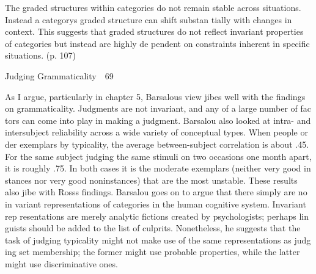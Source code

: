 \begin{styleStandard}
The graded structures within categories do not remain stable across situations. Instead a category{\textquotesingle}s graded structure can shift substan\- tially with changes in context. This suggests that graded structures do not reflect invariant properties of categories but instead are highly de\- pendent on constraints inherent in specific situations. (p. 107)
\end{styleStandard}


\clearpage\setcounter{page}{1}\begin{styleStandard}
Judging Grammaticality\ \ 69
\end{styleStandard}


\begin{styleTextbody}
As I argue, particularly in chapter 5, Barsalou{\textquotesingle}s view jibes well with the findings on grammaticality. Judgments are not invariant, and any of a large number of fac\- tors can come into play in making a judgment. Barsalou also looked at intra- and intersubject reliability across a wide variety of conceptual types. When people or\- der exemplars by typicality, the average between-subject correlation is about .45. For the same subject judging the same stimuli on two occasions one month apart, it is roughly .75. In both cases it is the moderate exemplars (neither very good in\- stances nor very good noninstances) that are the most unstable. These results also jibe with Ross{\textquotesingle}s findings. Barsalou goes on to argue that there simply are no in\- variant representations of categories in the human cognitive system. Invariant rep\- resentations are merely analytic fictions created by psychologists; perhaps lin\- guists should be added to the list of culprits. Nonetheless, he suggests that the task of judging typicality might not make use of the same representations as judg\- ing set membership; the former might use probable properties, while the latter might use discriminative ones.
\end{styleTextbody}


